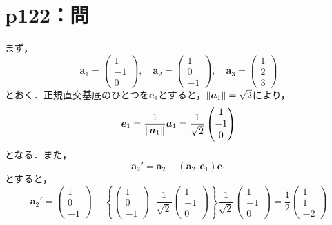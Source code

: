\documentclass[a4paper,10pt,fleqn]{ltjsarticle}
\begin{document}
\section*{p122：問}

\begin{tleftbar}
    まず，
    \[
        \bm{a}_1 = \begin{pmatrix} 1 \\ -1 \\ 0 \end{pmatrix},\quad \bm{a}_2 =\begin{pmatrix} 1 \\ 0 \\ -1 \end{pmatrix},\quad \bm{a}_3 = \begin{pmatrix} 1 \\ 2 \\ 3 \end{pmatrix}
    \]
    とおく．正規直交基底のひとつを$\bm{e}_1$とすると，$\norm{\bm{a}_1}=\sqrt{2}$により，
    \[
        \bm{e}_1 = \frac{1}{\norm{\bm{a}_1}} \bm{a}_1 = \frac{1}{\sqrt{2}} \begin{pmatrix} 1 \\ -1 \\ 0 \end{pmatrix}
    \]
    となる．また，
    \[
        \bm{a}_2 ' = \bm{a}_2 - (\bm{a}_2,\bm{e}_1)\bm{e}_1
    \]
    とすると，
    \[
        \bm{a}_2 ' = \begin{pmatrix} 1 \\ 0 \\ -1 \end{pmatrix}-\left \{ \begin{pmatrix} 1 \\ 0 \\ -1 \end{pmatrix} \cdot \frac{1}{\sqrt{2}} \begin{pmatrix} 1 \\ -1 \\ 0 \end{pmatrix} \right \} \frac{1}{\sqrt{2}} \begin{pmatrix} 1 \\ -1 \\ 0 \end{pmatrix} =\frac{1}{2} \begin{pmatrix} 1 \\ 1\\ -2 \end{pmatrix}
\]
\end{tleftbar}
\end{document}
